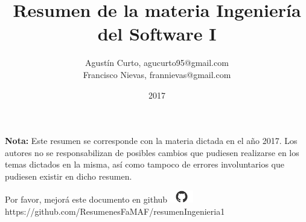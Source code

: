 \documentclass[12pt,a4paper]{article}
\author{Agustín Curto, agucurto95@gmail.com \\
			 Francisco Nievas, frannievas@gmail.com}
\title{Resumen de la materia Ingeniería del Software I}
\date{2017}
\newcommand{\PN}{\par\noindent}
\begin{document}
	\clearpage\maketitle
 	\thispagestyle{empty}
 	\tableofcontents

	\vspace{5cm}
	\PN \textbf{Nota:} Este resumen se corresponde con la materia dictada en el año 2017. Los autores no se
	responsabilizan de posibles cambios que pudiesen realizarse en los temas dictados en la misma, así como tampoco de
	errores involuntarios que pudiesen existir en dicho resumen.

	\vspace{\fill}
	\begin{center}
		Por favor, mejorá este documento en github
		\includegraphics[width=1cm]{graphics/github.png} \\
		https://github.com/ResumenesFaMAF/resumenIngenieria1
	\end{center}

	\pagebreak

  
  
\end{document}
